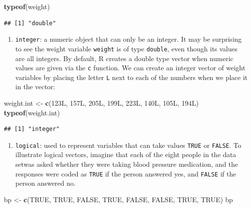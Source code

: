 \documentclass[
]{krantz}
\newenvironment{Shaded}{\begin{snugshade}}{\end{snugshade}}
\newcommand{\KeywordTok}[1]{\textcolor[rgb]{0.13,0.29,0.53}{\textbf{#1}}}
\newcommand{\NormalTok}[1]{#1}
\newcommand{\OtherTok}[1]{\textcolor[rgb]{0.56,0.35,0.01}{#1}}
\newcommand{\StringTok}[1]{\textcolor[rgb]{0.31,0.60,0.02}{#1}}
\providecommand{\tightlist}{%
  \setlength{\itemsep}{0pt}\setlength{\parskip}{0pt}}
\begin{document}
\begin{Shaded}
\begin{Highlighting}[]
\KeywordTok{typeof}\NormalTok{(weight)}
\end{Highlighting}
\end{Shaded}

\begin{verbatim}
## [1] "double"
\end{verbatim}

\begin{enumerate}
\def\labelenumi{\arabic{enumi}.}
\setcounter{enumi}{2}
\tightlist
\item
  \texttt{integer}: a numeric object that can only be an integer. It may be surprising to see the weight variable \texttt{weight} is of type \texttt{double}, even though its values are all integers. By default, R creates a double type vector when numeric values are given via the \texttt{c} function. We can create an integer vector of weight variables by placing the letter \texttt{L} next to each of the numbers when we place it in the vector:
\end{enumerate}

\begin{Shaded}
\begin{Highlighting}[]
\NormalTok{weight.int \textless{}{-}}\StringTok{ }\KeywordTok{c}\NormalTok{(123L, 157L, 205L, 199L, 223L, 140L, 105L, 194L)}
\KeywordTok{typeof}\NormalTok{(weight.int)}
\end{Highlighting}
\end{Shaded}

\begin{verbatim}
## [1] "integer"
\end{verbatim}

\begin{enumerate}
\def\labelenumi{\arabic{enumi}.}
\setcounter{enumi}{3}
\tightlist
\item
  \texttt{logical}: used to represent variables that can take values \texttt{TRUE} or \texttt{FALSE}. To illustrate logical vectors, imagine that each of the eight people in the data setwas asked whether they were taking blood pressure medication, and the responses were coded as \texttt{TRUE} if the person answered yes, and \texttt{FALSE} if the person answered no.
\end{enumerate}

\begin{Shaded}
\begin{Highlighting}[]
\NormalTok{bp \textless{}{-}}\StringTok{ }\KeywordTok{c}\NormalTok{(}\OtherTok{TRUE}\NormalTok{, }\OtherTok{TRUE}\NormalTok{, }\OtherTok{FALSE}\NormalTok{, }\OtherTok{TRUE}\NormalTok{, }\OtherTok{FALSE}\NormalTok{, }\OtherTok{FALSE}\NormalTok{, }\OtherTok{TRUE}\NormalTok{, }\OtherTok{TRUE}\NormalTok{)}
\NormalTok{bp}
\end{Highlighting}
\end{Shaded}
\end{document}
